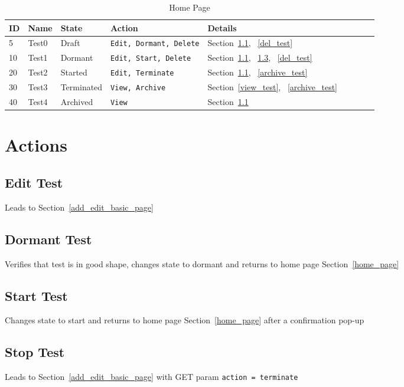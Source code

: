 \documentclass[letterpaper]{article}
\begin{document}
\begin{table}[hb]
\centering
\begin{tabular}{|l||l|l|l|l|l|l|l|l|}  \hline \hline
  {\bf ID} & {\bf Name} & {\bf State} & {\bf Action} & {\bf Details} \\ \hline \hline
  5 & Test0 & Draft & {\tt Edit, Dormant, Delete} & Section~\ref{edit_test},
  ~\ref{del_test} \\ \hline 
  10 & Test1 & Dormant & {\tt Edit, Start, Delete} &  
  Section~\ref{edit_test}, ~\ref{start_test}, ~\ref{del_test} \\ \hline 
  20 & Test2 & Started & {\tt Edit, Terminate} & 
  Section~\ref{edit_test}, ~\ref{archive_test} \\ \hline 
  30 & Test3 & Terminated & {\tt View, Archive} & 
  Section~\ref{view_test}, ~\ref{archive_test} \\ \hline 
  40 & Test4 & Archived & {\tt View}  &  Section~\ref{edit_test} \\ \hline
\hline
\end{tabular}
\caption{Home Page}
\label{tbl_home}
\end{table}


\section{Actions}
\subsection{Edit Test}
\label{edit_test}
Leads to Section~\ref{add_edit_basic_page}

\subsection{Dormant Test}
\label{start_test}
Verifies that test is in good shape, changes state to dormant and returns to home page Section~\ref{home_page}

\subsection{Start Test}
\label{start_test}
Changes state to start and returns to home page Section~\ref{home_page} after a
confirmation pop-up

\subsection{Stop Test}
\label{stop_test}
Leads to Section~\ref{add_edit_basic_page} with GET param {\tt action = terminate}
\end{document}
